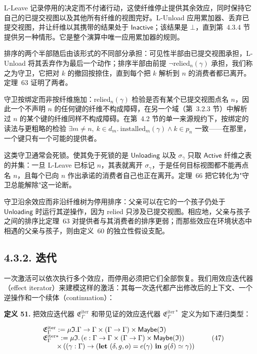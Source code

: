 L-Leave 记录停用的决定而不付诸行动，这使纤维停止提供其余效应，同时保持它自己的已提交视图以及其他所有纤维的视图完好。L-Unload 应用累加器、丢弃已提交视图，并让纤维以其携带的结果处于 \(\mathsf { I n a c t i v e }\)；该结果是 \(\bot\)，直到第~4.3.4 节提供另一种情形。它是整个演算中唯一应用累加器的规则。

排序的两个半部随后由该形式的不同部分承担：可见性半部由已提交视图承担，L-Unload 将其丢弃作为最后一个动作；排序半部由前提 \(\neg \mathrm { r e l i e d } _ { n } ( \gamma )\) 承担，我们称之为守卫，它把对 \(k\) 的撤回按捺住，直到每个把 \(k\) 解析到 \(n\) 的消费者都已离开。定理~63 证明了两者。

守卫按绑定而非按纤维施加：\(\mathrm { r e l i e d } _ { n } ( \gamma )\) 检验是否有某个已提交视图点名 \(n\)，因此一个不声明 \(n\) 的任何键的纤维不构成障碍，在另一个域（第~3.2.3 节）中解析过 \(n\) 的某个键的纤维同样不构成障碍。在第~4.2 节的单一来源规约下，按绑定的读法与更粗略的检验 \(\exists m \neq n ,\ k \in d _ { m } .\ \mathrm { i n s t a l l e d } _ { m } ( \gamma ) \wedge k \in p _ { n }\) 一致——在那里，一个键只有一个可能的提供者。

这类守卫通常会死锁。使其免于死锁的是 \(\mathsf { U n l o a d i n g }\) 以及 \(\sigma _ { \gamma }\) 只取 \(\mathsf { A c t i v e }\) 纤维之表的并集：一旦 L-Leave 已标记 \(n\)，其表就离开 \(\sigma _ { \gamma }\)，于是任何目标视图都不能再点名 \(n\)，且每个已向 \(n\) 作出承诺的消费者自己也正在离开。定理~66 把它转化为"守卫总能解除"这一论断。

守卫沿余效应而非沿纤维树为停用排序：父亲可以在它的一个孩子仍处于 \(\mathsf { U n l o a d i n g }\) 时运行其逆操作，因为 relied 只涉及已提交视图。相应地，父亲与孩子之间的排序比定理~63 对提供者与其消费者的排序更弱；而那些效应在环境状态中相遇的父亲与孩子，则由定义~60 的独立性假设支配。

\subsection{4.3.2. 迭代}\label{iteration}

一次激活可以依次执行多个效应，而停用必须把它们全部恢复。我们用效应迭代器（effect iterator）来建模这样的激活：其每一次迭代都产出修改后的上下文、一个逆操作和一个续体（continuation）：

\textbf{定义 51.} 把效应迭代器 \(\mathfrak { E } _ { \Gamma } ^ { \mathrm { i t e r } }\) 和带见证的效应迭代器 \(\mathfrak { E } _ { \Gamma } ^ { \mathrm { i t e r * } }\) 定义为如下递归类型：

\[
\begin{array} { r l } & { \mathfrak { E } _ { \Gamma } ^ { \mathrm { i t e r } } : = \mu \mathfrak { I } . \Gamma \to \Gamma \times ( \Gamma \to \Gamma ) \times \mathsf { M a y b e } ( \mathfrak { I } ) } \\ & { \mathfrak { E } _ { \Gamma } ^ { \mathrm { i t e r * } } : = \mu \mathfrak { I } . \left( e : \Gamma \to \Gamma \times ( \Gamma \to \Gamma ) \times \mathsf { M a y b e } ( \mathfrak { I } ) \right) } \\ & { \qquad \times \left( ( \gamma : \Gamma ) \to ( \mathbf { l e t } \ ( \delta , g , o ) = e ( \gamma ) \ \mathbf { i n } \ g ( \delta ) \simeq \gamma ) \right) } \end{array}\tag{47}
\]

